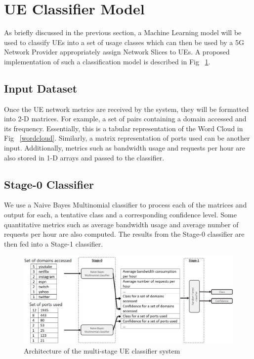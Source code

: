 \documentclass[conference]{IEEEtran}
\begin{document}
\section{UE Classifier Model}

As briefly discussed in the previous section, a Machine Learning model will be used to classify UEs into a set of usage classes which can then be used by a 5G Network Provider appropriately assign Network Slices to UEs. A proposed implementation of such a classification model is described in  Fig ~\ref{uemodel}.

\subsection{Input Dataset}
Once the UE network metrics are received by the system, they will be formatted into 2-D matrices. For example, a set of pairs containing a domain accessed and its frequency. Essentially, this is a tabular representation of the Word Cloud in Fig ~\ref{wordcloud}. Similarly, a matrix representation of ports used can be another input. Additionally, metrics such as bandwidth usage and requests per hour are also stored in 1-D arrays and passed to the classifier.

\subsection{Stage-0 Classifier}
We use a Naive Bayes Multinomial classifier to process each of the matrices and output for each, a tentative class and a corresponding confidence level. Some quantitative metrics such as average bandwidth usage and average number of requests per hour are also computed. The results from the Stage-0 classifier are then fed into a Stage-1 classifier.

\begin{figure}[ht]
\centerline{\includegraphics[scale=0.4]{fig5.png}}
\caption{Architecture of the multi-stage UE classifier system}
\label{uemodel}
\end{figure}
\end{document}
